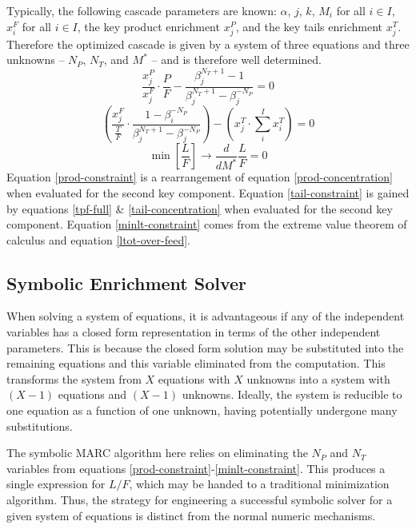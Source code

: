 \documentclass{ansconf}
\begin{document}
Typically, the following cascade parameters are known:
$\alpha$, 
$j$, $k$, 
$M_i$ for all $i\in I$, 
$x_i^F$ for all $i\in I$, 
the key product enrichment $x_j^P$, and the key 
tails enrichment $x_j^T$.  Therefore the optimized cascade is given by 
a system of three equations and three unknowns --
$N_P$, $N_T$, and $M^*$ -- and is therefore well determined.
\begin{equation}
\frac{x_j^P}{x_j^F}\cdot\frac{P}{F} - \frac{\beta_j^{N_T+1} - 1}
                                           {\beta_j^{N_T+1} - \beta_j^{-N_P}} = 0
\label{prod-constraint}
\end{equation}
\begin{equation}
\left(\frac{x_j^F}{\frac{T}{F}} \cdot \frac{1 - \beta_i^{-N_P}}
                                           {\beta_j^{N_T+1} - \beta_j^{-N_P}} \right)
- \left(x_j^T\cdot\sum_i^{I} x_i^T\right) = 0
\label{tail-constraint}
\end{equation}
\begin{equation}
\min\left[\frac{L}{F}\right]\to \frac{d}{dM^*} \frac{L}{F} = 0
\label{minlt-constraint}
\end{equation}
Equation \ref{prod-constraint} is a rearrangement of equation \ref{prod-concentration}
when evaluated for the second key component.
Equation \ref{tail-constraint} is gained by equations \ref{tpf-full} \&
\ref{tail-concentration} when evaluated for the second key component.
Equation \ref{minlt-constraint} comes from the extreme value theorem of calculus
and equation \ref{ltot-over-feed}.

\subsection{Symbolic Enrichment Solver}
\label{sec:symes}

When solving a system of equations, it is advantageous if any of the independent 
variables has a closed form representation in terms of the other independent 
parameters. This is because the closed form solution may be substituted into 
the remaining equations and this variable eliminated from the computation.  This
transforms the system from $X$ equations with $X$ unknowns into a system with 
$(X-1)$ equations and $(X-1)$  unknowns.  Ideally, the system is reducible 
to one equation as a function of one unknown, having potentially undergone many 
substitutions.

The symbolic MARC algorithm here relies on eliminating the $N_P$ and $N_T$ variables
from equations \ref{prod-constraint}-\ref{minlt-constraint}. This produces a single
expression for $L/F$, which may be handed to a traditional minimization algorithm.
Thus, the strategy for engineering a successful symbolic solver for a given system
of equations is distinct from the normal numeric mechanisms.
\end{document}
